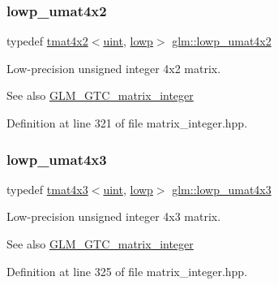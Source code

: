 \subsubsection{\texorpdfstring{lowp\_umat4x2}{lowp\_umat4x2}}
{\footnotesize\ttfamily typedef \mbox{\hyperlink{structglm_1_1tmat4x2}{tmat4x2}}$<$\mbox{\hyperlink{group__core__precision_ga4fd29415871152bfb5abd588334147c8}{uint}}, \mbox{\hyperlink{namespaceglm_a0f04f086094c747d227af4425893f545ae161af3fc695e696ce3bf69f7332bc2d}{lowp}}$>$ \mbox{\hyperlink{group__gtc__matrix__integer_ga5f4e6bb892b20b532bd9caa9aee120b9}{glm\+::lowp\+\_\+umat4x2}}}

Low-\/precision unsigned integer 4x2 matrix. \begin{DoxySeeAlso}{See also}
\mbox{\hyperlink{group__gtc__matrix__integer}{G\+L\+M\+\_\+\+G\+T\+C\+\_\+matrix\+\_\+integer}} 
\end{DoxySeeAlso}


Definition at line 321 of file matrix\+\_\+integer.\+hpp.

\mbox{\label{group__gtc__matrix__integer_gae94cb13770f09d0a086e6fb627f47b84}} 
\subsubsection{\texorpdfstring{lowp\_umat4x3}{lowp\_umat4x3}}
{\footnotesize\ttfamily typedef \mbox{\hyperlink{structglm_1_1tmat4x3}{tmat4x3}}$<$\mbox{\hyperlink{group__core__precision_ga4fd29415871152bfb5abd588334147c8}{uint}}, \mbox{\hyperlink{namespaceglm_a0f04f086094c747d227af4425893f545ae161af3fc695e696ce3bf69f7332bc2d}{lowp}}$>$ \mbox{\hyperlink{group__gtc__matrix__integer_gae94cb13770f09d0a086e6fb627f47b84}{glm\+::lowp\+\_\+umat4x3}}}

Low-\/precision unsigned integer 4x3 matrix. \begin{DoxySeeAlso}{See also}
\mbox{\hyperlink{group__gtc__matrix__integer}{G\+L\+M\+\_\+\+G\+T\+C\+\_\+matrix\+\_\+integer}} 
\end{DoxySeeAlso}


Definition at line 325 of file matrix\+\_\+integer.\+hpp.

\mbox{\label{group__gtc__matrix__integer_ga6ec13ea43b4328e29219f8515c188997}} 

